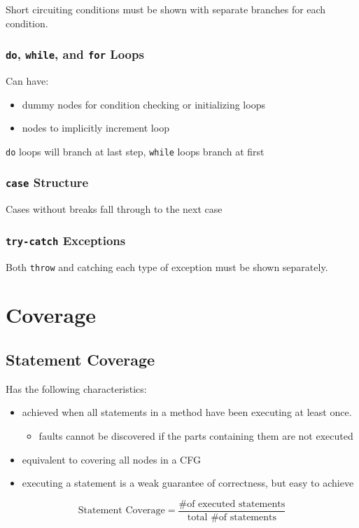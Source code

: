 \documentclass[11pt]{article}
\begin{document}
Short circuiting conditions must be shown with separate branches for each condition.
\subsubsection{\texttt{do}, \texttt{while}, and \texttt{for} Loops}
\label{sec:org5240483}
Can have:
\begin{itemize}
\item dummy nodes for condition checking or initializing loops
\item nodes to implicitly increment loop
\end{itemize}

\texttt{do} loops will branch at last step, \texttt{while} loops branch at first
\subsubsection{\texttt{case} Structure}
\label{sec:org7f8d399}
Cases without breaks fall through to the next case
\subsubsection{\texttt{try-catch} Exceptions}
\label{sec:org3d0ded9}
Both \texttt{throw} and catching each type of exception must be shown separately.
\section{Coverage}
\label{sec:orge4c21f5}
\subsection{Statement Coverage}
\label{sec:org0af3557}
Has the following characteristics:
\begin{itemize}
\item achieved when all statements in a method have been executing at least once.
\begin{itemize}
\item faults cannot be discovered if the parts containing them are not executed
\end{itemize}
\item equivalent to covering all nodes in a CFG
\item executing a statement is a weak guarantee of correctness, but easy to achieve
\end{itemize}
$$
        \text{Statement Coverage} = \frac{\text{\# of executed statements}}{\text{total \# of statements}}
$$
\end{document}
